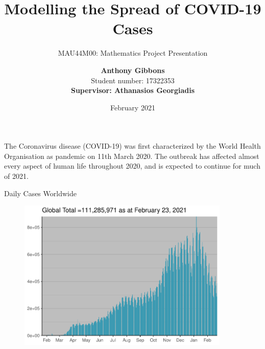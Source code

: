 \documentclass{beamer}
\title[COVID-19 Modelling]{
Modelling the Spread of COVID-19 Cases}
\subtitle{MAU44M00: Mathematics Project Presentation}
\author[Anthony Gibbons]{\textbf{Anthony Gibbons} \\
Student number: 17322353 \\
\textbf{Supervisor: Athanasios Georgiadis}}
\date{February 2021}
\begin{document}
\begin{frame}
\titlepage
\end{frame}

\begin{frame}
The Coronavirus disease (COVID-19) was first characterized by the World Health Organisation as pandemic on 11th March 2020. The outbreak has affected almost every aspect of human life throughout 2020, and is expected to continue for much of 2021.
\end{frame}

\begin{frame}{Daily Cases Worldwide \cite{countrydata}}
\begin{figure}[H]
\includegraphics[width=0.9\textwidth]{Plots/WorldTotal-xn.pdf}
\end{figure}
\end{frame}
\end{document}
